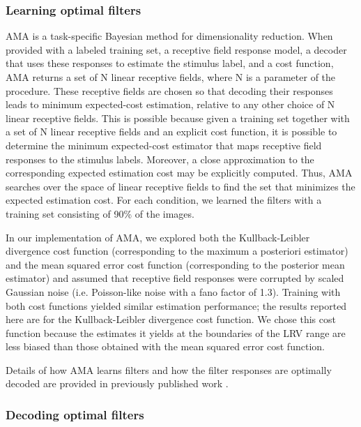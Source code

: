 \documentclass{jov}
\begin{document}
\subsubsection*{Learning optimal filters}
AMA is a task-specific Bayesian method for dimensionality reduction.
When provided with a labeled training set, a receptive field response model, a decoder that uses these responses to estimate the stimulus label, and a cost function, AMA returns a set of N linear receptive fields, where N is a parameter of the procedure.
These receptive fields are chosen so that decoding their responses leads to minimum expected-cost estimation, relative to any other choice of N linear receptive fields.
This is possible because given a training set together with a set of N linear receptive fields and an explicit cost function, it is possible to determine the minimum expected-cost estimator that maps receptive field responses to the stimulus labels.
Moreover, a close approximation to the corresponding expected estimation cost may be explicitly computed.
Thus, AMA searches over the space of linear receptive fields to find the set that minimizes the expected estimation cost.
For each condition, we learned the filters with a training set consisting of 90\% of the images.

In our implementation of AMA, we explored both the Kullback-Leibler divergence cost function (corresponding to the maximum a posteriori estimator) and the mean squared error cost function (corresponding to the posterior mean estimator) and assumed that receptive field responses were corrupted by scaled Gaussian noise (i.e. Poisson-like noise with a fano factor of 1.3).
Training with both cost functions yielded similar estimation performance; the results reported here are for the Kullback-Leibler divergence cost function.
We chose this cost function because the estimates it yields at the boundaries of the LRV range are less biased than those obtained with the mean squared error cost function.

Details of how AMA learns filters and how the filter responses are optimally decoded are provided in previously published work \cite{geisler2009optimal,burge2017accuracy,jaini2017linking}.

\subsubsection*{Decoding optimal filters}
\end{document}
